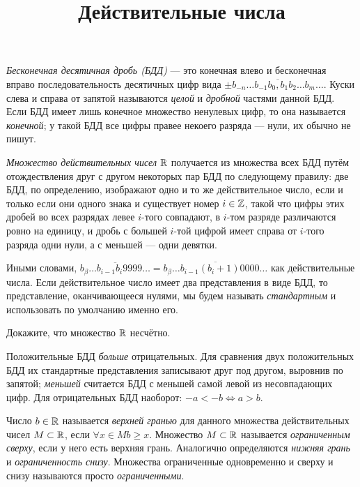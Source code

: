 \documentclass[a4paper, 12pt, num=26]{listok}
\begin{document}
\title{Действительные числа}
\maketitle{}
\begin{definition}
	\textit{Бесконечная десятичная дробь (БДД)} --- это конечная влево и бесконечная вправо последовательность десятичных цифр вида
	$\pm\overline{b_{-n}\ldots b_{-1}b_0{,}b_1b_2\ldots b_m\ldots}$.
	Куски слева и справа от запятой называются \textit{целой} и \textit{дробной} частями данной БДД.
	Если БДД имеет лишь конечное множество ненулевых цифр, то она называется \textit{конечной};
	у такой БДД все цифры правее некоего разряда --- нули, их обычно не пишут.
\end{definition}
\begin{definition}
	\textit{Множество действительных чисел} $\mathbb{R}$ получается из множества всех БДД путём отождествления друг с другом некоторых пар
	БДД по следующему правилу: две БДД, по определению, изображают одно и то же действительное число, если и только если они одного знака
	и существует номер $i \in \mathbb{Z}$, такой что цифры этих дробей во всех разрядах левее $i$-того совпадают, в $i$-том разряде различаются ровно на единицу,
	и дробь с большей $i$-той цифрой имеет справа от $i$-того разряда одни нули, а с меньшей — одни девятки.

	Иными словами, $\overline{b_\beta \ldots b_{i - 1}b_{i}9999\ldots} = \overline{b_\beta \ldots b_{i - 1}(b_i + 1)0000\ldots}$ как действительные числа.
	Если действительное число имеет два представления в виде БДД, то представление, оканчивающееся нулями,
	мы будем называть \textit{стандартным} и использовать по умолчанию именно его.
\end{definition}
\begin{problem}
	Докажите, что множество $\mathbb{R}$ несчётно.
\end{problem}
\begin{definition}
	Положительные БДД \textit{больше} отрицательных.
	Для сравнения двух положительных БДД их стандартные представления записывают друг под другом,
	выровнив по запятой; \textit{меньшей} считается БДД с меньшей самой левой из несовпадающих цифр.
	Для отрицательных БДД наоборот: $-a < -b \Leftrightarrow a > b$.
\end{definition}
\begin{definition}
	Число $b \in \mathbb{R}$ называется \textit{верхней гранью} для данного множества действительных чисел $M \subset \mathbb{R}$,
	если $\forall{x \in M} b \ge x$. Множество $M \subset \mathbb{R}$ называется \textit{ограниченным сверху}, если у него есть верхняя грань.
	Аналогично определяются \textit{нижняя грань} и \textit{ограниченность снизу}.
	Множества ограниченные одновременно и сверху и снизу называются просто \textit{ограниченными}.
\end{definition}
\end{document}
